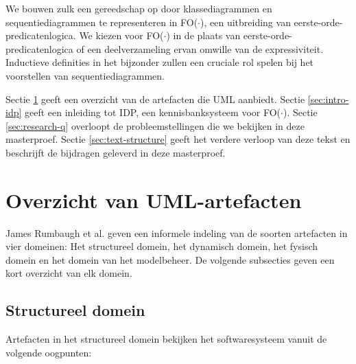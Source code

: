 We bouwen zulk een gereedschap op door klassediagrammen en sequentiediagrammen te representeren in FO($\cdot$), een uitbreiding van eerste-orde-predicatenlogica. We kiezen voor FO($\cdot$) in de plaats van eerste-orde-predicatenlogica of een deelverzameling ervan omwille van de expressiviteit. Inductieve definities in het bijzonder zullen een cruciale rol spelen bij het voorstellen van sequentiediagrammen.

Sectie \ref{sec:uml-artifacts} geeft een overzicht van de artefacten die UML aanbiedt. Sectie \ref{sec:intro-idp} geeft een inleiding tot IDP\cite{DeCatBroes2014PLaa}, een kennisbanksysteem voor FO($\cdot$). Sectie \ref{sec:research-q} overloopt de probleemstellingen die we bekijken in deze masterproef. Sectie \ref{sec:text-structure} geeft het verdere verloop van deze tekst en beschrijft de bijdragen geleverd in deze masterproef.

\section{Overzicht van UML-artefacten}\label{sec:uml-artifacts}

James Rumbaugh et al.\cite{RumbaughJames2005Tuml} geven een informele indeling van de soorten artefacten in vier domeinen: Het structureel domein, het dynamisch domein, het fysisch domein en het domein van het modelbeheer. De volgende subsecties geven een kort overzicht van elk domein.

\subsection{Structureel domein}

Artefacten in het structureel domein bekijken het softwaresysteem vanuit de volgende oogpunten:


